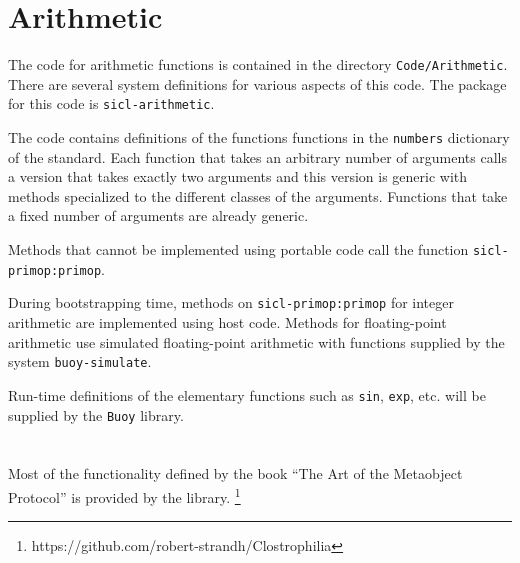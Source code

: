 \section{Arithmetic}

The code for arithmetic functions is contained in the directory
\texttt{Code/Arithmetic}.  There are several \asdf{} system
definitions for various aspects of this code.  The package for this
code is \texttt{sicl-arithmetic}.

The code contains definitions of the functions functions in the
\texttt{numbers} dictionary of the standard.  Each function that takes
an arbitrary number of arguments calls a version that takes exactly
two arguments and this version is generic with methods specialized to
the different classes of the arguments.  Functions that take a fixed
number of arguments are already generic.

Methods that cannot be implemented using portable code call the
function \texttt{sicl-primop:primop}.

During bootstrapping time, methods on \texttt{sicl-primop:primop} for
integer arithmetic are implemented using host code.  Methods for
floating-point arithmetic use simulated floating-point arithmetic with
functions supplied by the system \texttt{buoy-simulate}.

Run-time definitions of the elementary functions such as \texttt{sin},
\texttt{exp}, etc. will be supplied by the \texttt{Buoy} library.

\section{\clos{}}
\label{sec-clos}

Most of the functionality defined by the book ``The Art of the
Metaobject Protocol'' is provided by the \clostrophilia{} library.%
\footnote{https://github.com/robert-strandh/Clostrophilia}



